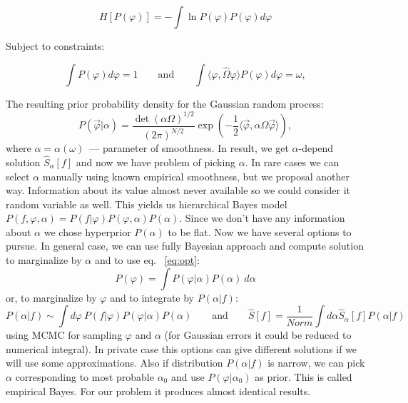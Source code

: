 \documentclass{webofc}
\begin{document}
\begin{equation*}
  H[P(\varphi)] = -\int \ln{P(\varphi)} P(\varphi) d\varphi
\end{equation*}

Subject to constraints:

\begin{equation}
  \int P(\varphi) d\varphi = 1
  \qquad\mbox{and}\qquad
  \int \langle \varphi,\hat{\Omega}\varphi \rangle P(\varphi) d\varphi = \omega,  
  \label{eq-smoothness}
\end{equation}

The resulting prior probability density for the Gaussian random process:
\begin{equation}
  P(\vec{\varphi}|\alpha) = \frac{\det(\alpha\Omega)^{1/2}}{(2\pi)^{N/2}} 
  \exp\left(-\frac{1}{2}\langle\vec{\varphi},\alpha\Omega\vec{\varphi}\rangle\right),
  \label{eq-prior}
\end{equation}
where $\alpha = \alpha(\omega)$~--- parameter of smoothness. In result, we get $\alpha$-depend solution $\hat{S}_{\alpha}[f]$ and now we have problem of picking $\alpha$. In rare cases we can select $\alpha$ manually using known empirical smoothness, but we proposal another way. Information about its value almost never available so we could consider it random variable as well. This yields us hierarchical Bayes model $P(f,\varphi,\alpha) = P(f|\varphi)P(\varphi,\alpha)P(\alpha)$.
Since we don't have any information about $\alpha$ we chose hyperprior $P(\alpha)$ to be flat. Now we have several options to pursue. In general case, we can use fully Bayesian approach  and compute solution to marginalize by $\alpha$ and to use eq. ~\ref{eq:opt}:
    \begin{equation}\label{eq:varAposteriorAlpha}
    P(\varphi) = \int P(\varphi|\alpha) P(\alpha)~d\alpha 
    \end{equation}
or,  to marginalize by $\varphi$ and to integrate by $P(\alpha|f)$:
    \begin{equation}
    P(\alpha|f) \sim \int d\varphi~P(f|\varphi)P(\varphi|\alpha)P(\alpha)
    \qquad\mbox{and}\qquad
    \hat{S}[f] =\frac{1}{Norm} \int d\alpha \hat{S}_{\alpha}[f] P(\alpha|f)
    \label{eq:solveAposteriorAlpha}
    \end{equation}
    using MCMC for sampling $\varphi$ and $\alpha$ (for Gaussian errors it could be reduced to numerical integral). In private case this options can give different solutions if we will use some approximations. Also if distribution $P(\alpha|f)$ is narrow, we can pick $\alpha$ corresponding to most probable $\alpha_0$ and use $P(\varphi|\alpha_0)$ as prior. This is called empirical Bayes. For our problem it produces almost identical results.
    
\end{document}
